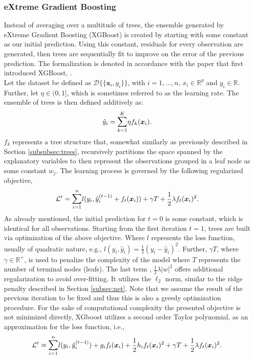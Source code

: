 \documentclass[a4paper,12pt, headsepline]{scrartcl}
\numberwithin{equation}{section}
\begin{document}
\subsubsection{eXtreme Gradient Boosting}\label{subsubsec:xgb}
Instead of averaging over a multitude of trees, the ensemble generated by eXtreme Gradient Boosting (XGBoost) is created by starting with some constant as our initial prediction. Using this constant, residuals for every observation are generated, then trees are sequentially fit to improve on the error of the previous prediction. The formalization is denoted in accordance with the paper that first introduced XGBoost, \citet{chen2016}.\\
Let the dataset be defined as $\mathcal{D}\{\{\bm x_i, y_i\}\}$, with $i = 1, ..., n$, $x_i \in \mathbb{R}^p$ and $y_i \in \mathbb{R}$. Further, let $\eta \in (0, 1]$, which is sometimes referred to as the learning rate. The ensemble of trees is then defined additively as:
\[
\hat y_i = \mathlarger{\sum}\limits_{k = 1}^K \eta f_k(\bm x_i).
\]
$f_k$ represents a tree structure that, somewhat similarly as previously described in Section \ref{subsubsec:trees}, recursively partitions the space spanned by the explanatory variables to then represent the observations grouped in a leaf node as some constant $w_j$. The learning process is governed by the following regularized objective,
\[
\mathcal{L}^t = \mathlarger{\sum}\limits_{i = 1}^n l( y_i, \hat y_i^{(t - 1)} + f_t(\bm x_i)) + \gamma T + \frac{1}{2}\lambda f_t(\bm x_i)^2.
\]
As already mentioned, the initial prediction for $t = 0$ is some constant, which is identical for all observations. Starting from the first iteration $t = 1$, trees are built via optimization of the above objective. Where $l$ represents the loss function, usually of quadratic nature, e.g., $l(y_i, \hat y_i) = \frac{1}{2} (y_i - \hat y_i)^2$. Further, $\gamma T$, where $\gamma \in \mathbb{R}^+$, is used to penalize the complexity of the model where $T$ represents the number of terminal nodes (leafs). The last term , $\frac{1}{2}\lambda|w|^2$ offers additional regularization to avoid over-fitting. It utilizes the $\ell_2$ norm, similar to the ridge penalty described in Section \ref{subsec:net}. Note that we assume the result of the previous iteration to be fixed and thus this is also a greedy optimization procedure. For the sake of computational complexity the presented objective is not minimized directly, XGboost utilizes a second order Taylor polynomial, as an approximation for the loss function, i.e.,
\[
\mathcal{L}^t \approx \mathlarger{\sum}\limits_{i = 1}^n l( y_i, \hat y_i^{(t - 1)}) + g_i f_t(\bm x_i) + \frac{1}{2}h_i f_t( \bm x_i)^2 + \gamma T + \frac{1}{2}\lambda f_t(\bm x_i)^2.
\]
\end{document}
